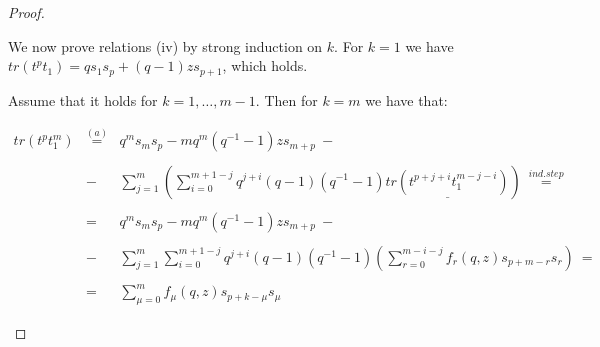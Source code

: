 \documentclass[10pt,a4paper]{amsart}
\begin{document}
\begin{proof}
\begin{itemize}
\noindent We now prove relations (iv) by strong induction on $k$. For $k=1$ we have $tr(t^pt_1)=qs_1s_p+(q-1)zs_{p+1}$, which holds.

\smallbreak

\noindent Assume that it holds for $k=1, \ldots, m-1$. Then for $k=m$ we have that:

\[
\begin{array}{lcl}
tr(t^pt_1^m) & \overset{(a)}{=} & q^ms_ms_p-mq^m(q^{-1}-1)zs_{m+p}\ -\\
&&\\
& - & \sum_{j=1}^{m}{\left(\sum_{i=0}^{m+1-j}{q^{j+i}(q-1)(q^{-1}-1)\underline{tr(t^{p+j+i}t_1^{m-j-i})}}\right)}\ \overset{ind. step}{=}\\
&&\\
& = & q^ms_ms_p-mq^m(q^{-1}-1)zs_{m+p}\ -\\
&&\\
& - & \sum_{j=1}^{m}{\sum_{i=0}^{m+1-j}{q^{j+i}(q-1)(q^{-1}-1)\left(\sum_{r=0}^{m-i-j}{f_r(q,z)s_{p+m-r}s_{r}} \right)}}\ =\\
&&\\
& = & \sum_{\mu=0}^{m}{f_{\mu}(q,z)s_{p+k-\mu}s_{\mu}}
\end{array}
\]

\end{itemize}
\end{proof}
\end{document}
